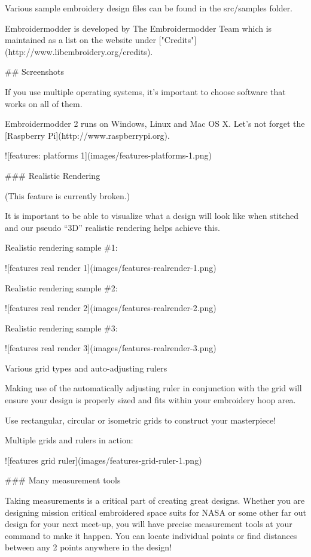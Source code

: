 Various sample embroidery design files can be found in
the src/samples folder.

Embroidermodder is developed by The Embroidermodder Team which is maintained as a
list on the website under ["Credits"](http://www.libembroidery.org/credits).

## Screenshots

If you use multiple operating systems, it's important to choose software that works on all of them.

Embroidermodder 2 runs on Windows, Linux and Mac OS X. Let's not forget the [Raspberry
Pi](http://www.raspberrypi.org).

![features: platforms 1](images/features-platforms-1.png)

### Realistic Rendering

(This feature is currently broken.)

It is important to be able to visualize what a design will look like when stitched and our
pseudo ``3D'' realistic rendering helps achieve this.

Realistic rendering sample \#1:

![features real render 1](images/features-realrender-1.png)

Realistic rendering sample \#2:

![features real render 2](images/features-realrender-2.png)

Realistic rendering sample \#3:

![features real render 3](images/features-realrender-3.png)

Various grid types and auto-adjusting rulers

Making use of the automatically adjusting ruler in conjunction with the grid will ensure your
design is properly sized and fits within your embroidery hoop area.

Use rectangular, circular or isometric grids to construct your masterpiece!

Multiple grids and rulers in action:

![features grid ruler](images/features-grid-ruler-1.png)

### Many measurement tools

Taking measurements is a critical part of creating great designs. Whether you are designing
mission critical embroidered space suits for NASA or some other far out design for your next
meet-up, you will have precise measurement tools at your command to make it happen. You can
locate individual points or find distances between any 2 points anywhere in the design!


